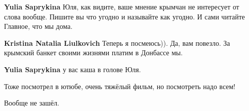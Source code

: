 \begin{itemize}
\begin{itemize}
 
\textbf{Yulia Saprykina} Юля, как видите, ваше мнение крымчан не интересует от
слова вообще. Пишите вы что угодно и называйте как угодно. И сами читайте \Smiley[1.0][yellow]
Главное, что мы дома.

 
\textbf{Kristina Natalia Liulkovich} Теперь я посмеюсь)). Да, вам повезло. За крымский банкет своими жизнями платим в Донбассе мы.

 
\textbf{Yulia Saprykina} у вас каша в голове Юля.

\end{itemize}

 
Тоже посмотрел в ютюбе, очень тяжёлый фильм, но посмотреть надо всем!

 
Вообще не зашёл.

 

\end{itemize}
